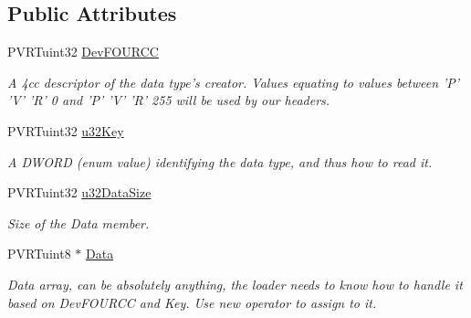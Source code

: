 \subsection*{Public Attributes}
\begin{DoxyCompactItemize}
\item 
\hypertarget{struct_meta_data_block_a4e84dbbc43a2ff6d29932b3e81bb3f13}{P\+V\+R\+Tuint32 \hyperlink{struct_meta_data_block_a4e84dbbc43a2ff6d29932b3e81bb3f13}{Dev\+F\+O\+U\+R\+C\+C}}\label{struct_meta_data_block_a4e84dbbc43a2ff6d29932b3e81bb3f13}

\begin{DoxyCompactList}\small\item\em A 4cc descriptor of the data type's creator. Values equating to values between 'P' 'V' 'R' 0 and 'P' 'V' 'R' 255 will be used by our headers. \end{DoxyCompactList}\item 
\hypertarget{struct_meta_data_block_afecde206adf069a05ab0fb49ed33f634}{P\+V\+R\+Tuint32 \hyperlink{struct_meta_data_block_afecde206adf069a05ab0fb49ed33f634}{u32\+Key}}\label{struct_meta_data_block_afecde206adf069a05ab0fb49ed33f634}

\begin{DoxyCompactList}\small\item\em A D\+W\+O\+R\+D (enum value) identifying the data type, and thus how to read it. \end{DoxyCompactList}\item 
\hypertarget{struct_meta_data_block_ad48251b9f93f2978dbf91955c7e4d729}{P\+V\+R\+Tuint32 \hyperlink{struct_meta_data_block_ad48251b9f93f2978dbf91955c7e4d729}{u32\+Data\+Size}}\label{struct_meta_data_block_ad48251b9f93f2978dbf91955c7e4d729}

\begin{DoxyCompactList}\small\item\em Size of the Data member. \end{DoxyCompactList}\item 
\hypertarget{struct_meta_data_block_a9f9600f3a0cc09d04e77b0c1b60c15b5}{P\+V\+R\+Tuint8 $\ast$ \hyperlink{struct_meta_data_block_a9f9600f3a0cc09d04e77b0c1b60c15b5}{Data}}\label{struct_meta_data_block_a9f9600f3a0cc09d04e77b0c1b60c15b5}

\begin{DoxyCompactList}\small\item\em Data array, can be absolutely anything, the loader needs to know how to handle it based on Dev\+F\+O\+U\+R\+C\+C and Key. Use new operator to assign to it. \end{DoxyCompactList}\end{DoxyCompactItemize}


